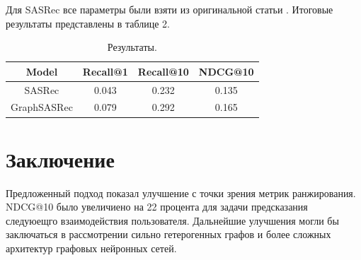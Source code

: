 \documentclass{article}
\begin{document}
Для SASRec все параметры были взяти из оригинальной статьи \cite{sasrec}. Итоговые результаты представлены в таблице 2.

\begin{table}[h]
    \centering
    \begin{tabular}{c|c|c|c}
        Model & Recall@1 & Recall@10 & NDCG@10 \\
        \hline
        SASRec & 0.043 & 0.232 & 0.135 \\
		GraphSASRec & 0.079 & 0.292 & 0.165 \\
    \end{tabular}
    \caption{Результаты.}
    \label{tab:my_label}
\end{table}

\section{Заключение}

Предложенный подход показал улучшение с точки зрения метрик ранжирования. NDCG@10 было увеличиено на 22 процента для задачи предсказания следуюещго взаимодействия пользователя.
Дальнейшие улучшения могли бы заключаться в рассмотрении сильно гетерогенных графов и более сложных архитектур графовых нейронных сетей.


 
\end{document}

